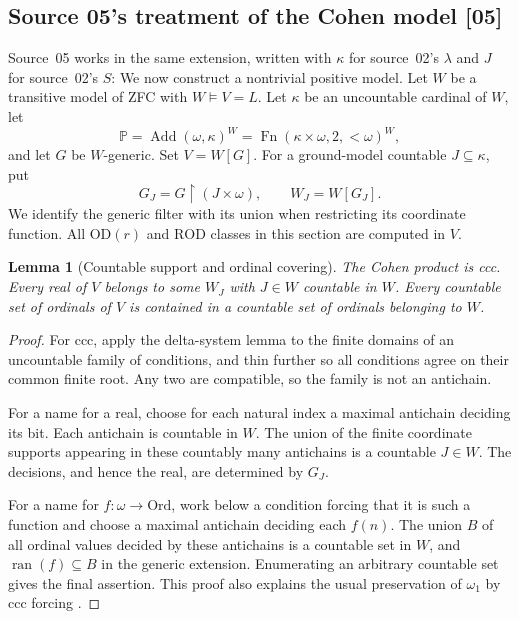\documentclass[11pt,a4paper]{article}
\numberwithin{equation}{section}
\newtheorem{lemma}[lemma]{Lemma}
\theoremstyle{definition}
\theoremstyle{remark}
\newcommand{\Ord}{\mathrm{Ord}}
\newcommand{\OD}{\mathrm{OD}}
\newcommand{\res}{\mathbin{\upharpoonright}}
\newcommand{\src}[1]{\textup{\textsf{\small[#1]}}}
\newcommand{\ROD}{\mathrm{ROD}}
\begin{document}



\subsection{Source 05's treatment of the Cohen model \src{05}}
\label{dsn:ca:sec:cohen}

Source~05 works in the same extension, written with $\kappa$ for
source~02's $\lambda$ and $J$ for source~02's $S$:
We now construct a nontrivial positive model. Let $W$ be a transitive
model of ZFC with $W\models V=L$. Let $\kappa$ be an uncountable cardinal
of $W$, let
\[
 \mathbb P=\operatorname{Add}(\omega,\kappa)^W
 =\operatorname{Fn}(\kappa\times\omega,2,{<}\omega)^W,
\]
and let $G$ be $W$-generic. Set $V=W[G]$. For a ground-model countable
$J\subseteq\kappa$, put
\[
 G_J=G\res(J\times\omega),\qquad W_J=W[G_J].
\]
We identify the generic filter with its union when restricting its
coordinate function. All $\OD(r)$ and $\ROD$ classes in this section
are computed in $V$.

\begin{lemma}[Countable support and ordinal covering]\label{dsn:ca:lem:ccc}
The Cohen product is ccc. Every real of $V$ belongs to some $W_J$ with
$J\in W$ countable in $W$. Every countable set of ordinals of $V$ is
contained in a countable set of ordinals belonging to $W$.
\end{lemma}
\begin{proof}
For ccc, apply the delta-system lemma to the finite domains of an
uncountable family of conditions, and thin further so all conditions
agree on their common finite root. Any two are compatible, so the
family is not an antichain.

For a name for a real, choose for each natural index a maximal antichain
deciding its bit. Each antichain is countable in $W$. The union of the
finite coordinate supports appearing in these countably many
antichains is a countable $J\in W$. The decisions, and hence the real,
are determined by $G_J$.

For a name for $f:\omega\to\Ord$, work below a condition forcing that
it is such a function and choose a maximal antichain deciding each
$f(n)$. The union $B$ of all ordinal values decided by these antichains
is a countable set in $W$, and $\operatorname{ran}(f)\subseteq B$ in
the generic extension. Enumerating an arbitrary countable set gives
the final assertion. This proof also explains the usual preservation
of $\omega_1$ by ccc forcing \cite{Jech}.
\end{proof}
\end{document}
